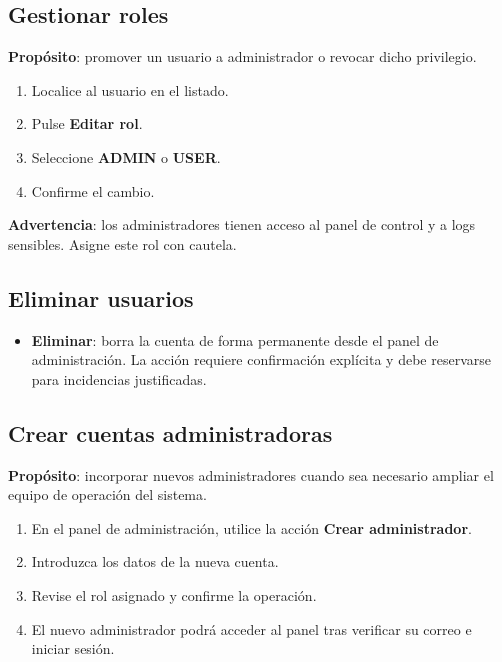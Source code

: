 \documentclass[11pt, a4paper]{article}
\begin{document}
\subsection{Gestionar roles}

\textbf{Prop\'{o}sito}: promover un usuario a administrador o revocar dicho privilegio.

\begin{enumerate}
    \item Localice al usuario en el listado.
    \item Pulse \textbf{Editar rol}.
    \item Seleccione \textbf{ADMIN} o \textbf{USER}.
    \item Confirme el cambio.
\end{enumerate}

\textbf{Advertencia}: los administradores tienen acceso al panel de control y a logs sensibles. Asigne este rol con cautela.

\subsection{Eliminar usuarios}

\begin{itemize}
    \item \textbf{Eliminar}: borra la cuenta de forma permanente desde el panel de administraci\'{o}n. La acci\'{o}n requiere confirmaci\'{o}n expl\'{i}cita y debe reservarse para incidencias justificadas.
\end{itemize}

\subsection{Crear cuentas administradoras}

\textbf{Prop\'{o}sito}: incorporar nuevos administradores cuando sea necesario ampliar el equipo de operaci\'{o}n del sistema.

\begin{enumerate}
    \item En el panel de administraci\'{o}n, utilice la acci\'{o}n \textbf{Crear administrador}.
    \item Introduzca los datos de la nueva cuenta.
    \item Revise el rol asignado y confirme la operaci\'{o}n.
    \item El nuevo administrador podr\'{a} acceder al panel tras verificar su correo e iniciar sesi\'{o}n.
\end{enumerate}
\end{document}
